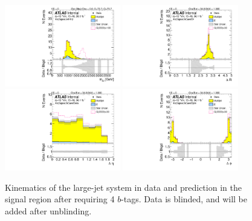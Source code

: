 \begin{figure}[htbp!]
\begin{center}
\includegraphics[width=0.45\textwidth,angle=-90]{figures/boosted/Signal/b77_FourTag_Signal_mHH_l_blind.pdf}
\includegraphics[width=0.45\textwidth,angle=-90]{figures/boosted/Signal/b77_FourTag_Signal_hCandDr_blind.pdf}\\
\includegraphics[width=0.45\textwidth,angle=-90]{figures/boosted/Signal/b77_FourTag_Signal_hCandDeta_blind.pdf}
\includegraphics[width=0.45\textwidth,angle=-90]{figures/boosted/Signal/b77_FourTag_Signal_hCandDphi_blind.pdf}
  \caption{Kinematics of the large-\R jet system in data and prediction in the signal region after requiring 4 $b$-tags. Data is blinded, and will be added after unblinding. }
  \label{fig:boosted-4b-signal-blind-ak10-system}
\end{center}
\end{figure}

